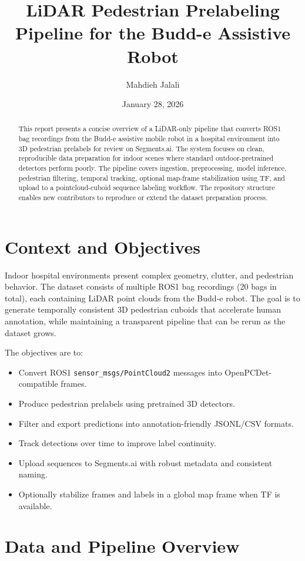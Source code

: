 \documentclass[a4paper,12pt]{article}
\title{LiDAR Pedestrian Prelabeling Pipeline for the Budd-e Assistive Robot}
\author{Mahdieh Jalali}
\date{January 28, 2026}
\begin{document}
\maketitle

\begin{abstract}
This report presents a concise overview of a LiDAR-only pipeline that converts ROS1 bag recordings from the Budd-e assistive mobile robot in a hospital environment into 3D pedestrian prelabels for review on Segments.ai. The system focuses on clean, reproducible data preparation for indoor scenes where standard outdoor-pretrained detectors perform poorly. The pipeline covers ingestion, preprocessing, model inference, pedestrian filtering, temporal tracking, optional map-frame stabilization using TF, and upload to a pointcloud-cuboid sequence labeling workflow. The repository structure enables new contributors to reproduce or extend the dataset preparation process.
\end{abstract}

\section{Context and Objectives}
Indoor hospital environments present complex geometry, clutter, and pedestrian behavior. The dataset consists of multiple ROS1 bag recordings (20 bags in total), each containing LiDAR point clouds from the Budd-e robot. The goal is to generate temporally consistent 3D pedestrian cuboids that accelerate human annotation, while maintaining a transparent pipeline that can be rerun as the dataset grows.

The objectives are to:
\begin{itemize}
\item Convert ROS1 \texttt{sensor\_msgs/PointCloud2} messages into OpenPCDet-compatible frames.
\item Produce pedestrian prelabels using pretrained 3D detectors.
\item Filter and export predictions into annotation-friendly JSONL/CSV formats.
\item Track detections over time to improve label continuity.
\item Upload sequences to Segments.ai with robust metadata and consistent naming.
\item Optionally stabilize frames and labels in a global map frame when TF is available.
\end{itemize}

\section{Data and Pipeline Overview}
\end{document}
